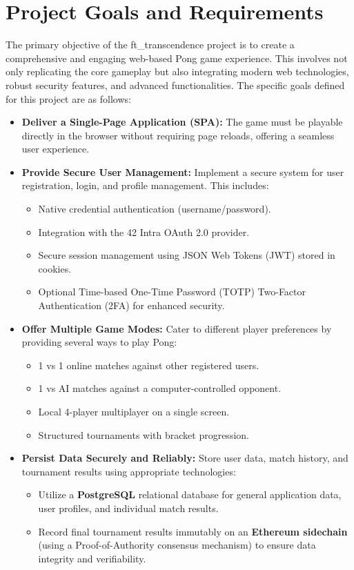 \chapter{Project Goals and Requirements}
\label{ch:goals}

The primary objective of the ft\_transcendence project is to create a comprehensive and engaging web-based Pong game experience. This involves not only replicating the core gameplay but also integrating modern web technologies, robust security features, and advanced functionalities. The specific goals defined for this project are as follows:

\begin{itemize}
    \item \textbf{Deliver a Single-Page Application (SPA):} The game must be playable directly in the browser without requiring page reloads, offering a seamless user experience.
    
    \item \textbf{Provide Secure User Management:} Implement a secure system for user registration, login, and profile management. This includes:
    \begin{itemize}
        \item Native credential authentication (username/password).
        \item Integration with the 42 Intra OAuth 2.0 provider.
        \item Secure session management using JSON Web Tokens (JWT) stored in cookies.
        \item Optional Time-based One-Time Password (TOTP) Two-Factor Authentication (2FA) for enhanced security.
    \end{itemize}
    
    \item \textbf{Offer Multiple Game Modes:} Cater to different player preferences by providing several ways to play Pong:
    \begin{itemize}
        \item 1 vs 1 online matches against other registered users.
        \item 1 vs AI matches against a computer-controlled opponent.
        \item Local 4-player multiplayer on a single screen.
        \item Structured tournaments with bracket progression.
    \end{itemize}
    
    \item \textbf{Persist Data Securely and Reliably:} Store user data, match history, and tournament results using appropriate technologies:
    \begin{itemize}
        \item Utilize a \textbf{PostgreSQL} relational database for general application data, user profiles, and individual match results.
        \item Record final tournament results immutably on an \textbf{Ethereum sidechain} (using a Proof-of-Authority consensus mechanism) to ensure data integrity and verifiability.
    \end{itemize}
    

\end{itemize}

